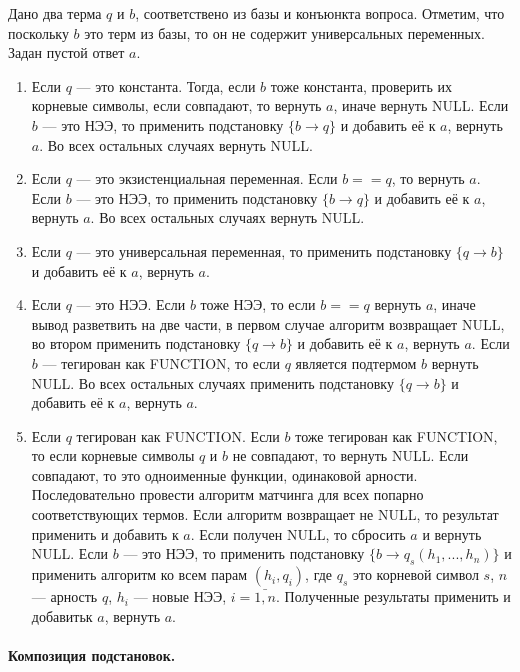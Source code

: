 Дано два терма $q$ и $b$, соответствено из базы и конъюнкта вопроса. Отметим, что поскольку $b$ это терм из базы, то он не содержит универсальных переменных. Задан пустой ответ $a$.
\begin{enumerate}
\item Если $q$ --- это константа. Тогда, если $b$ тоже константа, проверить их корневые символы, если совпадают, то вернуть $a$, иначе вернуть NULL. Если $b$ --- это НЭЭ, то применить подстановку $\{b \rightarrow q\}$ и добавить её к $a$, вернуть $a$. Во всех остальных случаях вернуть NULL.

\item Если $q$ --- это экзистенциальная переменная. Если $b==q$, то вернуть $a$. Если $b$ --- это НЭЭ, то применить подстановку $\{b \rightarrow q\}$ и добавить её к $a$, вернуть $a$. Во всех остальных случаях вернуть NULL.

\item Если $q$ --- это универсальная переменная, то применить подстановку $\{q \rightarrow b\}$ и добавить её к $a$, вернуть $a$.

\item Если $q$ --- это НЭЭ. Если $b$ тоже НЭЭ, то если $b==q$ вернуть $a$, иначе вывод разветвить на две части, в первом случае алгоритм возвращает NULL, во втором применить подстановку $\{q \rightarrow b\}$ и добавить её к $a$, вернуть $a$. Если $b$ --- тегирован как FUNCTION, то если $q$ является подтермом $b$ вернуть NULL. Во всех остальных случаях применить подстановку $\{q \rightarrow b\}$ и добавить её к $a$, вернуть $a$.

\item Если $q$ тегирован как FUNCTION. Если $b$ тоже тегирован как FUNCTION, то если корневые символы $q$ и $b$ не совпадают, то вернуть NULL. Если совпадают, то это одноименные функции, одинаковой арности. Последовательно провести алгоритм матчинга для всех попарно соответствующих термов. Если алгоритм возвращает не NULL, то результат применить и добавить к $a$. Если получен NULL, то сбросить $a$ и вернуть NULL. Если $b$ --- это НЭЭ, то применить подстановку $\{b \rightarrow q_s(h_1,...,h_n)\}$ и применить алгоритм ко всем парам $(h_i, q_i)$, где $q_s$ это корневой символ $s$, $n$ --- арность $q$, $h_i$ --- новые НЭЭ, $i = \bar{1,n}$. Полученные результаты применить и добавитьк  $a$, вернуть $a$.

\end{enumerate}

\paragraph{Композиция подстановок.}

